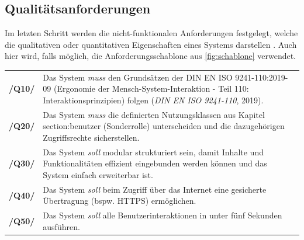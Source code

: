 \subsection*{Qualitätsanforderungen}
\label{section:qualität}
Im letzten Schritt werden die nicht-funktionalen Anforderungen festgelegt,
welche die qualitativen oder quantitativen Eigenschaften eines Systems
darstellen \cite{balzert2009}. Auch hier wird, falls möglich, die
Anforderungsschablone aus \ref{fig:schablone} verwendet.

\begin{center}
        \renewcommand{\arraystretch}{1.5}
        \begin{tabular}{p{}p{}}
                \hline
                \textbf{/Q10/} & Das System \textit{muss} den Grundsätzen der
                DIN EN ISO 9241-110:2019-09 (Ergonomie der
                Mensch-System-Interaktion - Teil 110: Interaktionsprinzipien)
                folgen (\textit{DIN EN ISO 9241-110}, 2019).                    \\
                \textbf{/Q20/} & Das System \textit{muss} die definierten
                Nutzungsklassen aus Kapitel section:benutzer (Sonderrolle)
                unterscheiden und die dazugehörigen Zugriffsrechte
                sicherstellen.                                                  \\
                \textbf{/Q30/} & Das System \textit{soll} modular strukturiert
                sein, damit Inhalte und Funktionalitäten effizient eingebunden
                werden können und das System einfach erweiterbar ist.           \\
                \textbf{/Q40/} & Das System \textit{soll} beim Zugriff über das
                Internet eine gesicherte Übertragung (bspw. \ac{HTTPS})
                ermöglichen.                                                    \\
                \textbf{/Q50/} & Das System \textit{soll} alle
                Benutzerinteraktionen in unter fünf Sekunden ausführen.         \\
                \hline
        \end{tabular}
\end{center}
